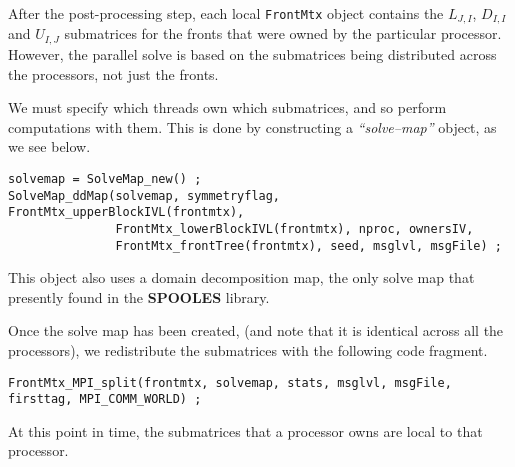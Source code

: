 After the post-processing step, each local {\tt FrontMtx} object 
contains the $L_{J,I}$, $D_{I,I}$ and $U_{I,J}$ submatrices
for the fronts that were owned by the particular processor.
However, the parallel solve is based on the submatrices being
distributed across the processors, not just the fronts.
\par
We must specify which threads own which submatrices, 
and so perform computations with them.
This is done by constructing a {\it ``solve--map''} object,
as we see below.
\begin{verbatim}
solvemap = SolveMap_new() ;
SolveMap_ddMap(solvemap, symmetryflag, FrontMtx_upperBlockIVL(frontmtx),
               FrontMtx_lowerBlockIVL(frontmtx), nproc, ownersIV,
               FrontMtx_frontTree(frontmtx), seed, msglvl, msgFile) ;
\end{verbatim}
This object also uses a domain decomposition map, the only solve map
that presently found in the {\bf SPOOLES} library.
\par
Once the solve map has been created, (and note that it is identical
across all the processors), we redistribute the submatrices
with the following code fragment.
\begin{verbatim}
FrontMtx_MPI_split(frontmtx, solvemap, stats, msglvl, msgFile, firsttag, MPI_COMM_WORLD) ;
\end{verbatim}
At this point in time, 
the submatrices that a processor owns are local to that processor.
\par
